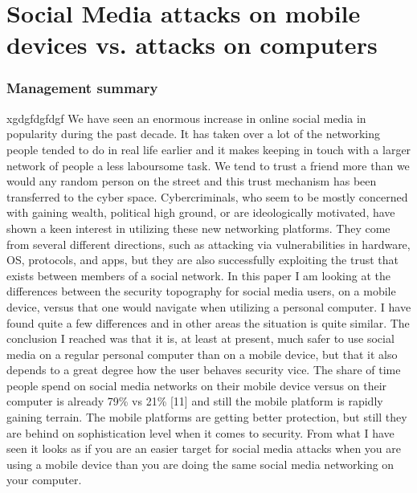 \chapter[Social Media Attacks]{Social Media attacks on mobile devices vs. attacks on computers}
\subsection*{Management summary}
xgdgfdgfdgf We have seen an enormous increase in online social media in popularity during the past decade. It has taken over a lot of the networking people tended to do in real life earlier and it makes keeping in touch with a larger network of people a less laboursome task. We tend to trust a friend more than we would any random person on the street and this trust mechanism has been transferred to the cyber space. Cybercriminals, who seem to be mostly concerned with gaining wealth, political high ground, or are ideologically motivated, have shown a keen interest in utilizing these new networking platforms. They come from several different directions, such as attacking via vulnerabilities in hardware, OS, protocols, and apps, but they are also successfully exploiting the trust that exists between members of a social network.
In this paper I am looking at the differences between the security topography for social media users, on a mobile device, versus that one would navigate when utilizing a personal computer. I have found quite a few differences and in other areas the situation is quite similar. The conclusion I reached was that it is, at least at present, much safer to use social media on a regular personal computer than on a mobile device, but that it also depends to a great degree how the user behaves security vice. The share of time people spend on social media networks on their mobile device versus on their computer is already 79\% vs 21\% [11] and still the mobile platform is rapidly gaining terrain. The mobile platforms are getting better protection, but still they are behind on sophistication level when it comes to security. From what I have seen it looks as if you are an easier target for social media attacks when you are using a mobile device than you are doing the same social media networking on your computer.

